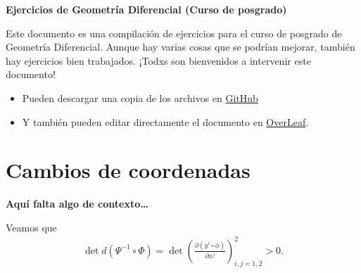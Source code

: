 \documentclass[11pt]{article}
\begin{document}
\title{}

\thispagestyle{empty}

\begin{center}
{\Large \bf Ejercicios de Geometría Diferencial (Curso de posgrado)}
\end{center}
\vspace{0.3cm}
Este documento es una compilación de ejercicios para el curso de posgrado de Geometría Diferencial. Aunque hay varias cosas que se podrían mejorar, también hay ejercicios bien trabajados. ¡Todxs son bienvenidos a intervenir este documento!
\begin{itemize}
	\item Pueden descargar una copia de los archivos en \href{https://github.com/danimalabares/geo-dif-exercises}{GitHub}
	\item Y también pueden editar directamente el documento en \href{https://www.overleaf.com/2426362393jhtzyfnpbmdy}{OverLeaf}.
\end{itemize}


\tableofcontents
\newpage
\section{Cambios de coordenadas}
\textbf{Aquí falta algo de contexto…}\vspace{1cm}

Veamos que
\begin{align*}
\det d(\Psi^{-1}\circ\Phi)= \det \left(\frac{\partial (y^i\circ \phi)}{\partial x^j}\right)_{i,j=1,2}^2 > 0.
\end{align*}
\end{document}
